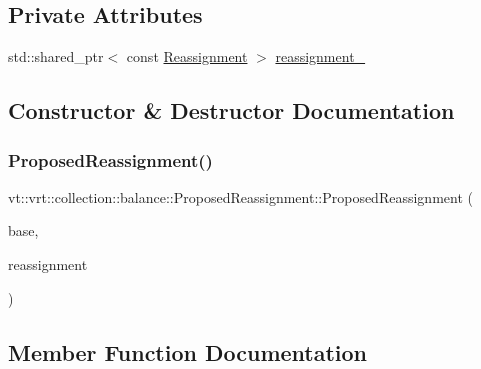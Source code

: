 \subsection*{Private Attributes}
\begin{DoxyCompactItemize}
\item 
std\+::shared\+\_\+ptr$<$ const \hyperlink{structvt_1_1vrt_1_1collection_1_1balance_1_1_reassignment}{Reassignment} $>$ \hyperlink{structvt_1_1vrt_1_1collection_1_1balance_1_1_proposed_reassignment_a923fcc247c401b766417f1e87009cb00}{reassignment\+\_\+}
\end{DoxyCompactItemize}


\subsection{Constructor \& Destructor Documentation}
\mbox{\label{structvt_1_1vrt_1_1collection_1_1balance_1_1_proposed_reassignment_a8c678464bec1fa46e24c69be66a45220}} 
\subsubsection{\texorpdfstring{Proposed\+Reassignment()}{ProposedReassignment()}}
{\footnotesize\ttfamily vt\+::vrt\+::collection\+::balance\+::\+Proposed\+Reassignment\+::\+Proposed\+Reassignment (\begin{DoxyParamCaption}\item[{std\+::shared\+\_\+ptr$<$ \hyperlink{structvt_1_1vrt_1_1collection_1_1balance_1_1_load_model}{balance\+::\+Load\+Model} $>$}]{base,  }\item[{std\+::shared\+\_\+ptr$<$ const \hyperlink{structvt_1_1vrt_1_1collection_1_1balance_1_1_reassignment}{Reassignment} $>$}]{reassignment }\end{DoxyParamCaption})}



\subsection{Member Function Documentation}
\mbox{\label{structvt_1_1vrt_1_1collection_1_1balance_1_1_proposed_reassignment_aef7e98817093a99fbda1eaae7cb29f79}} 
